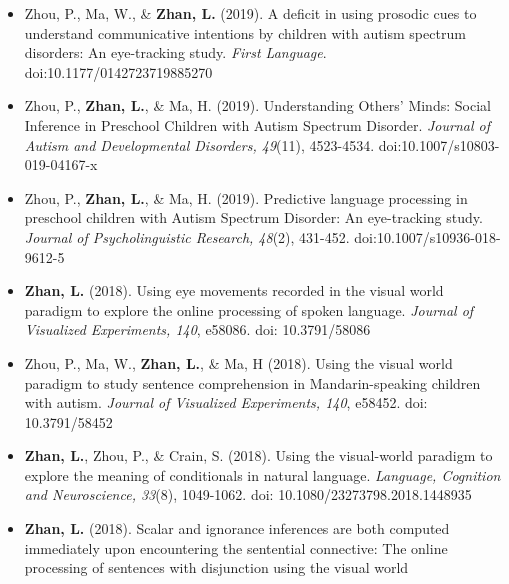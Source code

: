 \documentclass[12pt,]{article}
\begin{document}
\begin{itemize}
\item
  Zhou, P., Ma, W., \& \textbf{Zhan, L.} (2019). A deficit in using
  prosodic cues to understand communicative intentions by children with
  autism spectrum disorders: An eye-tracking study. \emph{First
  Language}. doi:10.1177/0142723719885270
  \href{https://publications.likan.info/Periodicals/FirstLang2019.pdf}{
  \faFilePdf[regular] }
\item
  Zhou, P., \textbf{Zhan, L.}, \& Ma, H. (2019). Understanding Others'
  Minds: Social Inference in Preschool Children with Autism Spectrum
  Disorder. \emph{Journal of Autism and Developmental Disorders,
  49}(11), 4523-4534. doi:10.1007/s10803-019-04167-x
  \href{https://publications.likan.info/Periodicals/JAutismDevDisord2019.pdf}{
  \faFilePdf[regular] }
\item
  Zhou, P., \textbf{Zhan, L.}, \& Ma, H. (2019). Predictive language
  processing in preschool children with Autism Spectrum Disorder: An
  eye-tracking study. \emph{Journal of Psycholinguistic Research,
  48}(2), 431-452. doi:10.1007/s10936-018-9612-5
  \href{https://publications.likan.info/Periodicals/JPsycholinguistRes2018.pdf}{
  \faFilePdf[regular] }
\item
  \textbf{Zhan, L.} (2018). Using eye movements recorded in the visual
  world paradigm to explore the online processing of spoken language.
  \emph{Journal of Visualized Experiments, 140}, e58086. doi:
  10.3791/58086
  \href{https://publications.likan.info/Periodicals/jove-protocol-58086.pdf}{
  \faFilePdf[regular] }
\item
  Zhou, P., Ma, W., \textbf{Zhan, L.}, \& Ma, H (2018). Using the visual
  world paradigm to study sentence comprehension in Mandarin-speaking
  children with autism. \emph{Journal of Visualized Experiments, 140},
  e58452. doi: 10.3791/58452
  \href{https://publications.likan.info/Periodicals/jove-protocol-58452.pdf}{
  \faFilePdf[regular] }
\item
  \textbf{Zhan, L.}, Zhou, P., \& Crain, S. (2018). Using the
  visual-world paradigm to explore the meaning of conditionals in
  natural language. \emph{Language, Cognition and Neuroscience, 33}(8),
  1049-1062. doi: 10.1080/23273798.2018.1448935
  \href{https://publications.likan.info/Periodicals/LangCognNeurosci2018.pdf}{
  \faFilePdf[regular] }
\item
  \textbf{Zhan, L.} (2018). Scalar and ignorance inferences are both
  computed immediately upon encountering the sentential connective: The
  online processing of sentences with disjunction using the visual world

\end{itemize}
\end{document}
